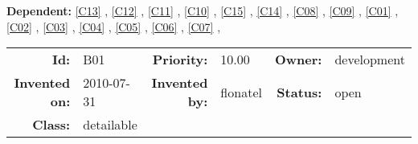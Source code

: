 \textbf{Dependent:} \ref{C13} , \ref{C12} , \ref{C11} , \ref{C10} , \ref{C15} , \ref{C14} , \ref{C08} , \ref{C09} , \ref{C01} , \ref{C02} , \ref{C03} , \ref{C04} , \ref{C05} , \ref{C06} , \ref{C07} , 

\par
{\small \begin{center}\begin{tabular}{rlrlrl}
\textbf{Id:} & B01 & \textbf{Priority:} & 10.00 & \textbf{Owner:} & development \\ 
\textbf{Invented on:} & 2010-07-31 & \textbf{Invented by:} & flonatel & \textbf{Status:} & open \\ 
\textbf{Class:} & detailable & & & & \\ 
\end{tabular}\end{center} }